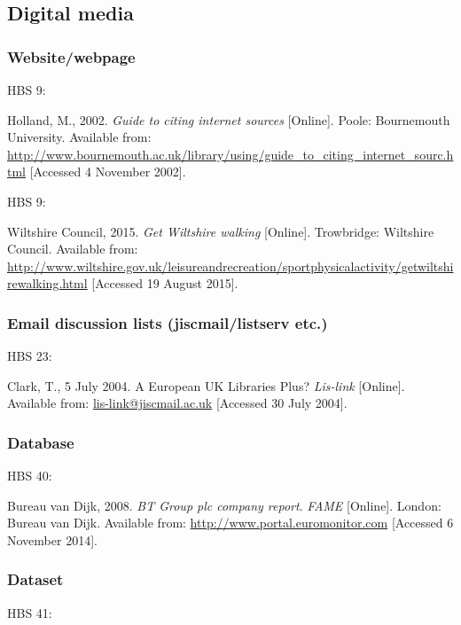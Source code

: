 \subsection{Digital media}

\subsubsection*{Website\slash webpage}

HBS 9: \cite{holland2002gci}

Holland, M., 2002. \emph{Guide to citing internet sources} [Online]. Poole: Bournemouth University. Available from: \url{http://www.bournemouth.ac.uk/library/using/guide_to_citing_internet_sourc.html} [Accessed 4 November 2002].


HBS 9: \cite{wiltshire2015gww}

Wiltshire Council, 2015. \emph{Get Wiltshire walking} [Online]. Trowbridge: Wiltshire Council. Available from: \url{http://www.wiltshire.gov.uk/leisureandrecreation/sportphysicalactivity/getwiltshirewalking.html} [Accessed 19 August 2015].



\subsubsection*{Email discussion lists (jiscmail\slash listserv etc.)}

HBS 23: \cite{clark2004euk}

Clark, T., 5 July 2004. A European UK Libraries Plus? \emph{Lis-link} [Online]. Available from: \url{lis-link@jiscmail.ac.uk} [Accessed 30 July 2004].



\subsubsection*{Database}

HBS 40: \cite{bvd2008bt}

Bureau van Dijk, 2008. \emph{BT Group plc company report}. \emph{FAME} [Online]. London: Bureau van Dijk. Available from: \url{http://www.portal.euromonitor.com} [Accessed 6 November 2014].



\subsubsection*{Dataset}

HBS 41: \cite{wilson2013rgc}

